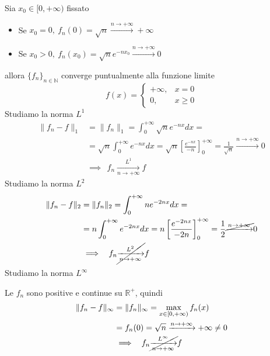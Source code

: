 Sia $x_{0} \in [ 0,+\infty )$ fissato
\begin{itemize}
\item Se $x_{0} =0,\ f_{n}( 0) =\sqrt{n}\xrightarrow{n\rightarrow +\infty } +\infty $
\item Se $x_{0}  >0,\ f_{n}( x_{0}) =\sqrt{n} e^{-nx_{0}}\xrightarrow{n\rightarrow +\infty } 0$
\end{itemize}
allora $\{f_{n}\}_{n\in \mathbb{N}}$ converge puntualmente alla funzione limite
\begin{equation*}
f( x) =\begin{cases}
+\infty , & x=0\\
0, & x\geqslant 0
\end{cases}
\end{equation*}
Studiamo la norma $L^{1}$
\begin{equation*}
\begin{aligned}
\| f_{n} -f\| _{1} & =\| f_{n} \| _{1} =\int ^{+\infty }_{0}\sqrt{n} e^{-nx} dx=\\
 & =\sqrt{n}\int ^{+\infty }_{0} e^{-nx} dx=\sqrt{n}\left[\frac{e^{-nx}}{-n}\right]^{+\infty }_{0} =\frac{1}{\sqrt{n}}\xrightarrow{n\rightarrow +\infty } 0\\
 & \implies \ \ f_{n}\xrightarrow[n\rightarrow +\infty ]{L^{1}} f
\end{aligned}
\end{equation*}
Studiamo la norma $L^{2}$
\begin{equation*}
\begin{aligned}
\| f_{n} -f\| _{2} & =\| f_{n} \| _{2} =\int ^{+\infty }_{0} ne^{-2nx} dx=\\
 & =n\int ^{+\infty }_{0} e^{-2nx} dx=n\left[\frac{e^{-2nx}}{-2n}\right]^{+\infty }_{0} =\frac{1}{2}\cancel{\xrightarrow{n\rightarrow +\infty }} 0\\
 & \implies \ \ f_{n}\cancel{\xrightarrow[n\rightarrow +\infty ]{L^{2}}} f
\end{aligned}
\end{equation*}
Studiamo la norma $L^{\infty }$

Le $f_{n}$ sono positive e continue su $\mathbb{R}^{+}$, quindi
\begin{equation*}
\begin{aligned}
\| f_{n} -f\| _{\infty } & =\| f_{n} \| _{\infty } =\max_{x\in [ 0,+\infty )} f_{n}( x)\\
 & =f_{n}( 0) =\sqrt{n}\xrightarrow{n\rightarrow +\infty } +\infty \neq 0\\
 & \implies \ \ f_{n}\cancel{\xrightarrow[n\rightarrow +\infty ]{L^{\infty }}} f
\end{aligned}
\end{equation*}
\Soluzione

